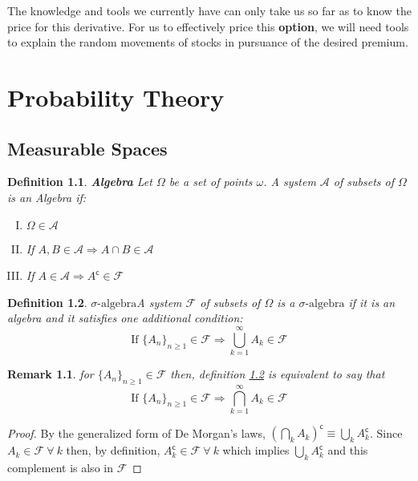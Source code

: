 \documentclass[11pt]{report}
\newtheorem{definition}{Definition}[chapter]
\newtheorem{remark}{Remark}[chapter]
\newcommand{\salg}{\sigma\text{-algebra}}
\newcommand{\salgF}{\mathscr{F}}
\begin{document}
The knowledge and tools we currently have can only take us so far as to know the price for this derivative. For us to effectively price this \textbf{option}, we will need tools to explain the random movements of stocks in pursuance of the desired premium.

\chapter{Probability Theory}

\section{Measurable Spaces}
\begin{definition}{\textbf{Algebra}}
	Let $\Omega$ be a set of points $\omega$. A system $\mathscr{A}$ of subsets of $\Omega$ is an Algebra if:
	\begin{enumerate}[I.]
		\item $\Omega \in \mathscr{A}$
		\item If $A, B \in \mathscr{A} \Rightarrow A \cap B \in \mathscr{A}$
		\item If $A \in \mathscr{A} \Rightarrow A^\mathsf{c} \in \salgF$
	\end{enumerate}
\end{definition}

\begin{definition}{\textbf{$\salg$}}\label{salgebra}
	A system $\salgF$ of subsets of $\Omega$ is a $\salg$ if it is an algebra and it satisfies one additional condition:
	\begin{equation*}
		\text{If } \{A_n\}_{n\geq 1} \in \salgF \Rightarrow \bigcup_{k=1}^{\infty} A_k \in \salgF 
	\end{equation*}
\end{definition}

\begin{remark}
	for $\{A_n\}_{n\geq 1} \in \salgF$ then, definition \ref{salgebra} is equivalent to say that
	\begin{equation*}
		\text{If } \{A_n\}_{n\geq 1} \in \salgF \Rightarrow \bigcap_{k=1}^{\infty} A_k \in \salgF
	\end{equation*}
\end{remark}

\begin{proof}
	By the generalized form of De Morgan's laws, $(\bigcap_k A_k)^\mathsf{c} \equiv \bigcup_k A_k^\mathsf{c}$. Since $A_k \in \salgF \ \forall \ k$ then, by definition,  $A_k^\mathsf{c} \in \salgF \ \forall \ k$ which implies  $\bigcup_k A_k^\mathsf{c}$ and this complement is also in $\salgF$
\end{proof}
\end{document}
